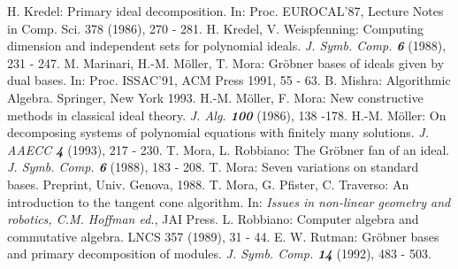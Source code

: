 \documentclass[a4paper,11pt]{article}
\newcommand{\gr}{Gr\"obner}
\begin{document}
\begin{thebibliography}{xxx}
 H. Kredel: Primary ideal decomposition. In: Proc.
EUROCAL'87, Lecture Notes in Comp. Sci. 378 (1986), 270 - 281.
 H. Kredel, V. Weispfenning: Computing dimension and
independent sets for polynomial ideals. {\it J. Symb. Comp. \bf 6} 
(1988), 231 - 247.
 M. Marinari, H.-M. M\"oller, T. Mora: {\gr} bases of
ideals given by dual bases. In: Proc. ISSAC'91, ACM Press 1991, 55 -
63.
 B. Mishra: Algorithmic Algebra. Springer, New York
1993.
 H.-M. M\"oller, F. Mora: New constructive methods in
classical ideal theory. {\it J. Alg. \bf 100} (1986), 138 -178.
 H.-M. M\"oller: On decomposing systems of polynomial
equations with finitely many solutions. {\em J. AAECC \bf 4} (1993),
217 - 230.  
 T. Mora, L. Robbiano: The Gr\"obner fan of an ideal.
{\it J. Symb. Comp. \bf 6} (1988), 183 - 208.
 T. Mora: Seven variations on standard bases. 
Preprint, Univ. Genova, 1988.
 T. Mora, G. Pfister, C. Traverso: An introduction to
the tangent cone algorithm. In: {\em Issues in non-linear geometry and 
robotics, C.M. Hoffman ed.}, JAI Press.
 L. Robbiano: Computer algebra and commutative algebra.
LNCS 357 (1989), 31 - 44.
 E. W. Rutman: {\gr} bases and primary decomposition of
modules. {\it J. Symb. Comp. \bf 14} (1992), 483 - 503.

\end{thebibliography}
\end{document}
